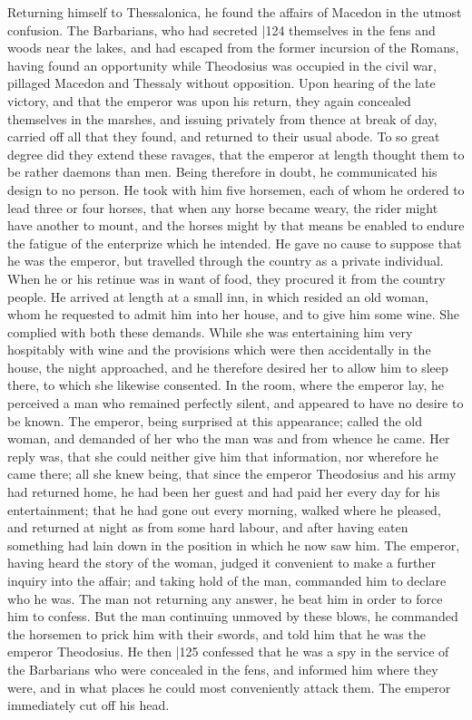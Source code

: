 Returning himself to Thessalonica, he found the affairs of Macedon in the utmost confusion. The Barbarians, who had secreted
|124 themselves in the fens and woods near the lakes, and had escaped from the former incursion of the Romans, having found an opportunity while Theodosius was occupied in the civil war, pillaged Macedon and Thessaly without opposition. Upon hearing of the late victory, and that the emperor was upon his return, they again concealed themselves in the marshes, and issuing privately from thence at break of day, carried off all that they found, and returned to their usual abode. To so great degree did they extend these ravages, that the emperor at length thought them to be rather daemons than men. Being therefore in doubt, he communicated his design to no person. He took with him five horsemen, each of whom he ordered to lead three or four horses, that when any horse became weary, the rider might have another to mount, and the horses might by that means be enabled to endure the fatigue of the enterprize which he intended. He gave no cause to suppose that he was the emperor, but travelled through the country as a private individual. When he or his retinue was in want of food, they procured it from the country people. He arrived at length at a small inn, in which resided an old woman, whom he requested to admit him into her house, and to give him some wine. She complied with both these demands. While she was entertaining him very hospitably with wine and the provisions which were then accidentally in the house, the night approached, and he therefore desired her to allow him to sleep there, to which she likewise consented. In the room, where the emperor lay, he perceived a man who remained perfectly silent, and appeared to have no desire to be known. The emperor, being surprised at this appearance; called the old woman, and demanded of her who the man was and from whence he came. Her reply was, that she could neither give him that information, nor wherefore he came there; all she knew being, that since the emperor Theodosius and his army had returned home, he had been her guest and had paid her every day for his entertainment; that he had gone out every morning, walked where he pleased, and returned at night as from some hard labour, and after having eaten something had lain down in the position in which he now saw him. The emperor, having heard the story of the woman, judged it convenient to make a further inquiry into the affair; and taking hold of the man, commanded him to declare who he was. The man not returning any answer, he beat him in order to force him to confess. But the man continuing unmoved by these blows, he commanded the horsemen to prick him with their swords, and told him that he was the emperor Theodosius. He then
|125 confessed that he was a spy in the service of the Barbarians who were concealed in the fens, and informed him where they were, and in what places he could most conveniently attack them. The emperor immediately cut off his head.

